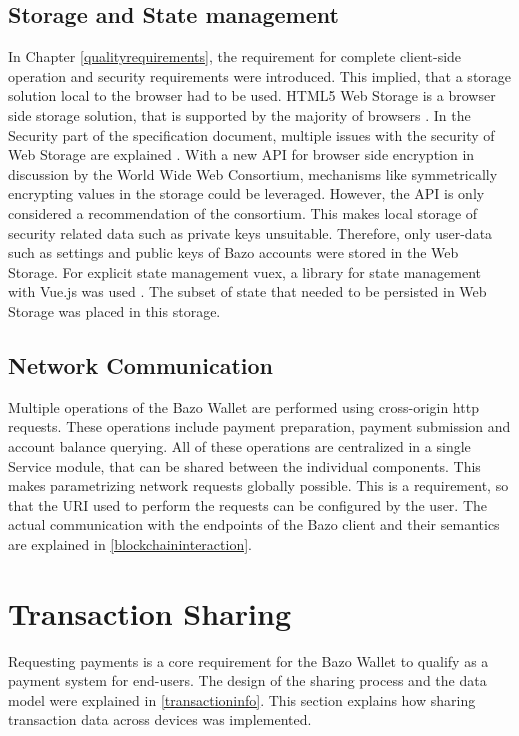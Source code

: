 \subsection{Storage and State management\label{storageandstate}}
In Chapter \ref{qualityrequirements}, the requirement for complete client-side operation and security requirements were introduced. This implied, that a storage solution local to the browser had to be used. HTML5 Web Storage is a browser side storage solution, that is supported by the majority of browsers \cite{localstoragetest} \cite{localstorage}.
In the Security part of the specification document, multiple issues with the security of Web Storage are explained \cite{localstorage}.
With a new API for browser side encryption in discussion by the World Wide Web Consortium, mechanisms like symmetrically encrypting values in the storage could be leveraged. However, the API is only considered a recommendation of the consortium\cite{webcrypto}.
This makes local storage of security related data such as private keys unsuitable. Therefore, only user-data such as settings and public keys of Bazo accounts were stored in the Web Storage. For explicit state management vuex, a library for state management with Vue.js was used \cite{vuex}. The subset of state that needed to be persisted in Web Storage was placed in this storage.
\subsection{Network Communication}
Multiple operations of the Bazo Wallet are performed using cross-origin http requests. These operations include payment preparation, payment submission and account balance querying. All of these operations are centralized in a single Service module, that can be shared between the individual components. This makes parametrizing network requests globally possible. This is a requirement, so that the URI used to perform the requests can be configured by the user. The actual communication with the endpoints of the Bazo client and their semantics are explained in \ref{blockchaininteraction}.

\section{Transaction Sharing}\label{transactoinsharing}
Requesting payments is a core requirement for the Bazo Wallet to qualify as a payment system for end-users. The design of the sharing process and the data model were explained in \ref{transactioninfo}. This section explains how sharing transaction data across devices was implemented.
